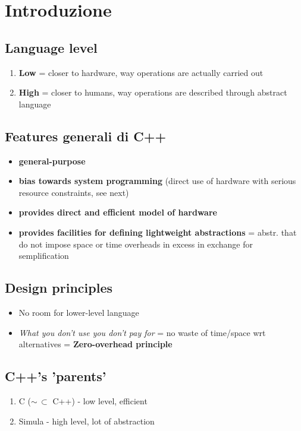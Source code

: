 \documentclass[10pt, oneside]{book}
\begin{document}
\tableofcontents
\newpage

\chapter{Introduzione}

\section{Language level}
\begin{enumerate}
\item \textbf{Low} = closer to hardware, way operations are actually carried out
\item \textbf{High} = closer to humans, way operations are described through abstract language
\end{enumerate}

\section{Features generali di C++}
\begin{itemize}
\item \textbf{general-purpose} 
\item \textbf{bias towards system programming} (direct use of hardware with serious resource constraints, see next)
\item \textbf{provides direct and efficient model of hardware}
\item \textbf{provides facilities for defining lightweight abstractions} = abstr. that do not impose space or time overheads in excess in exchange for semplification
\end{itemize}
\section{Design principles}
\begin{itemize}
\item No room for lower-level language
\item \textit{What you don't use you don't pay for} = no waste of time/space wrt alternatives = \textbf{Zero-overhead principle}
\end{itemize}

\section{C++'s 'parents'}
\begin{enumerate}
\item C ($\sim \, \subset$ C++) - low level, efficient
\item Simula - high level, lot of abstraction
\end{enumerate}
\end{document}
